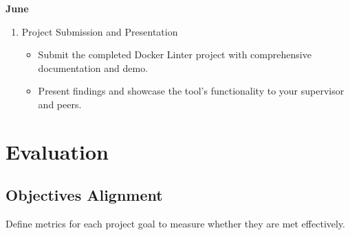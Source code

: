 \textbf{June}
\begin{enumerate}
    \item Project Submission and Presentation
    \begin{itemize}
        \item Submit the completed Docker Linter project with comprehensive documentation and demo.
        \item Present findings and showcase the tool's functionality to your supervisor and peers.
    \end{itemize}
\end{enumerate}

\section{Evaluation}
\subsection{Objectives Alignment}
Define metrics for each project goal to measure whether they are met effectively.

